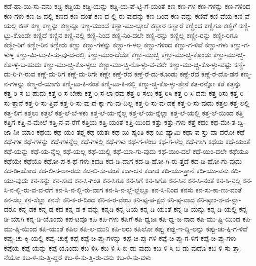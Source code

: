 {ಕಡೆ-ಹಾ-ಯಿ-ಸು-ವನು
ಕಡ್ಡಿ
ಕಡ್ಡಿಯ
ಕಡ್ಡಿ-ಯನ್ನು
ಕಡ್ಡಿ-ಯ-ಪೆ-ಟ್ಟಿ-ಗೆ-ಯಂತೆ
ಕಣ
ಕಣ-ಗಳ
ಕಣ-ಗಳನ್ನು
ಕಣ-ಗಳಿಂದ
ಕಣ-ಗಳು
ಕಣ-ಜ-ದಲ್ಲಿ
ಕಣದ
ಕಣ-ದಂತೆ
ಕಣ-ದ-ಲ್ಲಿ-ರು-ವುದನ್ನು
ಕಣ-ದಿಂದ
ಕಣ-ವನ್ನು
ಕಣಿವೆ
ಕಣಿ-ವೆಯ
ಕಣಿ-ವೆ-ಯಲ್ಲಿ
ಕಣ್
ಕಣ್ಣ
ಕಣ್ಣನ್ನು
ಕಣ್ಣನ್ನೂ
ಕಣ್ಣ-ಮುಂದೆ
ಕಣ್ಣಾ-ಮು-ಚ್ಚಾಲೆ
ಕಣ್ಣಾರ
ಕಣ್ಣಾರೆ
ಕಣ್ಣಿಂದ
ಕಣ್ಣಿಗೂ
ಕಣ್ಣಿಗೆ
ಕಣ್ಣಿ-ಟ್ಟು-ಕೊಂಡೇ
ಕಣ್ಣಿದೆ
ಕಣ್ಣಿನ
ಕಣ್ಣಿ-ನಲ್ಲಿ
ಕಣ್ಣಿ-ನಿಂದ
ಕಣ್ಣಿ-ನಿಂ-ದಲೇ
ಕಣ್ಣಿ-ರನ್ನು
ಕಣ್ಣಿಲ್ಲ
ಕಣ್ಣೀ-ರನ್ನು
ಕಣ್ಣೀ-ರಿಗೂ
ಕಣ್ಣೀ-ರಿಗೆ
ಕಣ್ಣೀ-ರಿನ
ಕಣ್ಣೀರು
ಕಣ್ಣು
ಕಣ್ಣು-ಗಳನ್ನು
ಕಣ್ಣು-ಗ-ಳಲ್ಲ
ಕಣ್ಣು-ಗಳಿಂದ
ಕಣ್ಣು-ಗ-ಳಿವೆ
ಕಣ್ಣು-ಗಳು
ಕಣ್ಣು-ಗ-ಳುಳ್ಳ
ಕಣ್ಣು-ಮಿ-ಟು-ಕಿ-ಸು-ವು-ದ-ರಲ್ಲಿ
ಕಣ್ಣು-ಮುಂ-ದೆಯೇ
ಕಣ್ಣು-ಮುಚ್ಚಿ
ಕಣ್ಣು-ಮು-ಚ್ಚಿ-ಕೊಂಡು
ಕಣ್ಣು-ಮು-ಚ್ಚಿ-ಕೊ-ಳ್ಳ-ಬ-ಹುದು
ಕಣ್ಣು-ಮು-ಚ್ಚಿ-ಕೊ-ಳ್ಳಲು
ಕಣ್ಣು-ಮು-ಚ್ಚಿ-ಕೊ-ಳ್ಳು-ವ-ವರೇ
ಕಣ್ಣು-ಮು-ಚ್ಚಿ-ಕೊ-ಳ್ಳು-ವಷ್ಟು
ಕಣ್ಣೆ-ದು-ರಿ-ಗಿ-ರುವ
ಕಣ್ಣೆ-ದು-ರಿಗೆ
ಕಣ್ಣೆ-ದು-ರಿಗೇ
ಕಣ್ಣೇ
ಕಣ್ತೆ-ರೆದ
ಕಣ್ತೆ-ರೆ-ದು-ಕೊಂಡು
ಕಣ್ದೆ-ರೆದ
ಕಣ್ದೆ-ರೆ-ದೊ-ಡನೆ
ಕಣ್ಮ-ನ-ಗಳನ್ನು
ಕಣ್ಮ-ರೆ-ಯಾಗು
ಕಣ್ಮಿ-ಟು-ಕಿ-ನಂತೆ
ಕಣ್ಮಿ-ಟು-ಕಿ-ನಲ್ಲಿ
ಕಣ್ಮು-ಚ್ಚಿ-ಕೊ-ಳ್ಳು-ತ್ತೇನೆ
ಕತ-ರನ್ನೋ
ಕತೆ
ಕತ್ತನ್ನು
ಕತ್ತ-ರಿ-ಸ-ಬ-ಹುದು
ಕತ್ತ-ರಿ-ಸ-ಬೇಕು
ಕತ್ತ-ರಿ-ಸ-ಲಾ-ರವು
ಕತ್ತ-ರಿ-ಸಲು
ಕತ್ತ-ರಿಸಿ
ಕತ್ತ-ರಿ-ಸಿ-ದನು
ಕತ್ತ-ರಿಸು
ಕತ್ತ-ರಿ-ಸು-ತ್ತಾನೆ
ಕತ್ತ-ರಿ-ಸು-ತ್ತಿವೆ
ಕತ್ತ-ರಿ-ಸು-ವು-ದ-ಕ್ಕಾ-ಗು-ವು-ದಿಲ್ಲ
ಕತ್ತ-ರಿ-ಸು-ವು-ದಕ್ಕೆ
ಕತ್ತ-ರಿ-ಸು-ವುದು
ಕತ್ತಲ
ಕತ್ತ-ಲಲ್ಲಿ
ಕತ್ತ-ಲಿಗೆ
ಕತ್ತಲು
ಕತ್ತಲೆ
ಕತ್ತ-ಲೆ-ಬೆ-ಳಕು
ಕತ್ತ-ಲೆ-ಯ-ನ್ನೆಲ್ಲ
ಕತ್ತ-ಲೆ-ಯ-ನ್ನೆಲ್ಲಾ
ಕತ್ತ-ಲೆ-ಯಲ್ಲಿ
ಕತ್ತ-ಲೆ-ಯಿಂದ
ಕತ್ತಿ
ಕತ್ತಿಗೆ
ಕತ್ತಿ-ನ-ಮೇಲೆ
ಕತ್ತಿ-ನ-ವ-ರೆಗೆ
ಕತ್ತಿಯ
ಕತ್ತಿ-ಯಂತೆ
ಕತ್ತಿ-ಯಿಂದ
ಕತ್ತು
ಕತ್ತು-ಗಳು
ಕತ್ತೆ
ಕಥಂ
ಕಥ-ಮೇ-ತ-ದ್ವಿ-ಜಾ-ನೀ-ಯಾಂ
ಕಥಯ
ಕಥ-ಯಂ-ತಶ್ಚ
ಕಥ-ಯತಃ
ಕಥ-ಯಿ-ಷ್ಯಂತಿ
ಕಥ-ಯಿ-ಷ್ಯಾಮಿ
ಕಥಾ-ವ-ಸ್ತು-ವಾ-ದರೋ
ಕಥೆ
ಕಥೆ-ಗಳ
ಕಥೆ-ಗಳನ್ನು
ಕಥೆ-ಗಳನ್ನೆಲ್ಲ
ಕಥೆ-ಗಳಲ್ಲಿ
ಕಥೆ-ಗಳು
ಕಥೆ-ಗ-ಳೆಂಬ
ಕಥೆ-ಗ-ಳೆಲ್ಲ
ಕಥೆ-ಗಾಗಿ
ಕಥೆಯ
ಕಥೆ-ಯಂತೆ
ಕಥೆ-ಯನ್ನು
ಕಥೆ-ಯ-ನ್ನೆಲ್ಲ
ಕಥೆ-ಯಲ್ಲ
ಕಥೆ-ಯಲ್ಲಿ
ಕಥೆ-ಯಾ-ಗು-ವುದು
ಕಥೆ-ಯಿಂ-ದಲೆ
ಕಥೆ-ಯಿಂ-ದಲೇ
ಕಥೆಯೂ
ಕಥೆಯೇ
ಕಥೆಯೊ
ಕಥೋ-ಪ-ಕ-ಥೆ-ಗಳು
ಕದಡಿ
ಕದ-ಡಿ-ದಾಗ
ಕದ-ಡಿ-ಹೋ-ಗಿ-ರು-ತ್ತದೆ
ಕದ-ಡಿ-ಹೋ-ಗು-ವುದು
ಕದ-ಡಿ-ಹೋದ
ಕದ-ಲಿ-ಸ-ಲಾ-ರದು
ಕದ-ಲಿ-ಸು-ವಂತೆ
ಕದಾ-ಚನ
ಕದಾಚಿ
ಕದಿ-ಯು-ತ್ತಾನೆ
ಕದಿ-ಯು-ವನು
ಕದಿ-ಯು-ವುದು
ಕನ-ಸನ್ನು
ಕನ-ಸಾದ
ಕನ-ಸಿ-ಗಿಂತ
ಕನ-ಸಿಗೂ
ಕನ-ಸಿಗೆ
ಕನ-ಸಿಗೊ
ಕನ-ಸಿನ
ಕನ-ಸಿ-ನಂತೆ
ಕನ-ಸಿ-ನಲ್ಲಿ
ಕನ-ಸಿ-ನ-ಲ್ಲಿ-ರು-ವ-ವ-ರೆಗೆ
ಕನ-ಸಿ-ನ-ಲ್ಲಿ-ರು-ವಾಗ
ಕನ-ಸಿ-ನ-ಲ್ಲೆ-ಲ್ಲೆಲ್ಲೂ
ಕನ-ಸಿ-ನಿಂದ
ಕನಸು
ಕನ-ಸು-ಕಾ-ಣು-ವಂತೆ
ಕನ-ಸೆಲ್ಲ
ಕನ-ಸೆಲ್ಲಾ
ಕನಸೇ
ಕನಿ-ಕ-ರ-ದಿಂದ
ಕನಿ-ಕ-ರ-ವೆಂಬ
ಕನಿ-ಷ್ಟ-ಪ-ಕ್ಷದ
ಕನಿ-ಷ್ಠ-ವಾದ
ಕನಿ-ಷ್ಠಾಂ-ಶ-ವ-ನ್ನಾ-ದರೂ
ಕನ್ನ-ಡಕ
ಕನ್ನ-ಡ-ಕದ
ಕನ್ನ-ಡ-ಕ-ವನ್ನು
ಕನ್ನಡಿ
ಕನ್ನ-ಡಿಯ
ಕನ್ನ-ಡಿ-ಯಂತೆ
ಕನ್ನ-ಡಿ-ಯನ್ನು
ಕನ್ನ-ಡಿ-ಯಲ್ಲಿ
ಕನ್ನ-ಡಿ-ಯಾಗಿ
ಕನ್ನ-ಡಿ-ಯೊಂದು
ಕಪ-ಟವೂ
ಕಪಿ
ಕಪಿ-ಗಳು
ಕಪಿಗೆ
ಕಪಿ-ಧ್ವಜಃ
ಕಪಿ-ಧ್ವ-ಜ-ನಾದ
ಕಪಿ-ಮು-ಷ್ಟಿ-ಯಿಂದ
ಕಪಿ-ಮು-ಷ್ಠಿ-ಯಿಂದ
ಕಪಿ-ಯಂತೆ
ಕಪಿಲ
ಕಪಿ-ಲ-ಮುನಿ
ಕಪಿ-ಲರು
ಕಪಿಲೋ
ಕಪ್ಪು
ಕಪ್ಪು-ಇ-ದ್ದಿ-ಲನ್ನು
ಕಪ್ಪು-ಚು-ಕ್ಕಿ-ಗ-ಳಿವೆ
ಕಪ್ಪು-ಚು-ಕ್ಕಿ-ಯಲ್ಲಿ
ಕಪ್ಪು-ಚುಕ್ಕೆ
ಕಪ್ಪೆ
ಕಪ್ಪೆ-ಚಿ-ಪ್ಪು-ಗಳನ್ನು
ಕಪ್ಪೆ-ಚಿ-ಪ್ಪು-ಗಳಿ
ಕಪ್ಪೆ-ಚಿ-ಪ್ಪು-ಗ-ಳಿಗೆ
ಕಪ್ಪೆ-ಚಿ-ಪ್ಪು-ಗಳು
ಕಪ್ಪೆಯ
ಕಪ್ಪೆ-ಯನ್ನು
ಕಪ್ಪೆ-ಯೊಂದು
ಕಬ-ಳಿಸಿ
ಕಬ-ಳಿ-ಸಿ-ಬಿ-ಡು-ವುದು
ಕಬ-ಳಿ-ಸಿ-ಬಿ-ಡು-ವುದೊ
ಕಬ-ಳಿ-ಸು-ತ್ತಾ-ನೆಯೋ
ಕಬ-ಳಿ-ಸು-ತ್ತಿ-ದ್ದರೆ
ಕಬ-ಳಿ-ಸು-ತ್ತಿ-ರು-ವನು
ಕಬ-ಳಿ-ಸು-ವಳು
}

